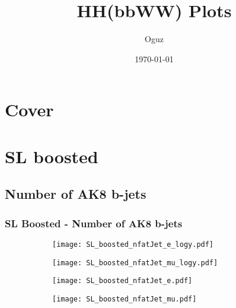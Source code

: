 \documentclass[aspectratio=169,8pt]{beamer}
\title{HH(bbWW) Plots}
\author{Oguz}
\institute{UCLouvain}
\date{\today}
\begin{document}
    \section{Cover}

    \frame{\titlepage}

\section{SL boosted}

\subsection{Number of AK8 b-jets}
\begin{frame}
\frametitle{SL Boosted - Number of AK8 b-jets}
\begin{figure}
\captionsetup[subfigure]{labelformat=empty}
\begin{subfigure}{0.375\textwidth}
\texttt{[image: SL\_boosted\_nfatJet\_e\_logy.pdf]}
\vspace*{-0.15cm}
\end{subfigure}
\hfil
\begin{subfigure}{0.375\textwidth}
\texttt{[image: SL\_boosted\_nfatJet\_mu\_logy.pdf]}
\vspace*{-0.15cm}
\end{subfigure}
\hfil
\begin{subfigure}{0.375\textwidth}
\texttt{[image: SL\_boosted\_nfatJet\_e.pdf]}
\vspace*{-0.15cm}
\end{subfigure}
\hfil
\begin{subfigure}{0.375\textwidth}
\texttt{[image: SL\_boosted\_nfatJet\_mu.pdf]}
\vspace*{-0.15cm}
\end{subfigure}
\hfil
\end{figure}
\end{frame}
\newpage
\end{document}
